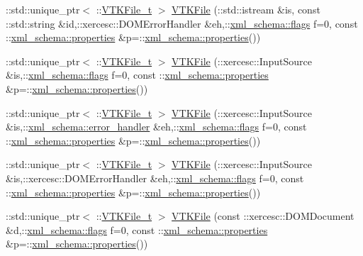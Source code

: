 \begin{DoxyCompactItemize}
\+::std\+::unique\+\_\+ptr$<$ \+::\hyperlink{classVTKFile__t}{V\+T\+K\+File\+\_\+t} $>$ \hyperlink{vtk-unstructured_8h_a05c0e5136170ae9d16a9c6422bab56b8}{V\+T\+K\+File} (\+::std\+::istream \&is, const \+::std\+::string \&id,\+::xercesc\+::\+D\+O\+M\+Error\+Handler \&eh,\+::\hyperlink{namespacexml__schema_a0612287d030cb2732d31a45b258fdc87}{xml\+\_\+schema\+::flags} f=0, const \+::\hyperlink{namespacexml__schema_a1a8ebac679580b41baebd62c7d641c1d}{xml\+\_\+schema\+::properties} \&p=\+::\hyperlink{namespacexml__schema_a1a8ebac679580b41baebd62c7d641c1d}{xml\+\_\+schema\+::properties}())
\item 
\+::std\+::unique\+\_\+ptr$<$ \+::\hyperlink{classVTKFile__t}{V\+T\+K\+File\+\_\+t} $>$ \hyperlink{vtk-unstructured_8h_aead3f615e5385068f5d1aac875400803}{V\+T\+K\+File} (\+::xercesc\+::\+Input\+Source \&is,\+::\hyperlink{namespacexml__schema_a0612287d030cb2732d31a45b258fdc87}{xml\+\_\+schema\+::flags} f=0, const \+::\hyperlink{namespacexml__schema_a1a8ebac679580b41baebd62c7d641c1d}{xml\+\_\+schema\+::properties} \&p=\+::\hyperlink{namespacexml__schema_a1a8ebac679580b41baebd62c7d641c1d}{xml\+\_\+schema\+::properties}())
\item 
\+::std\+::unique\+\_\+ptr$<$ \+::\hyperlink{classVTKFile__t}{V\+T\+K\+File\+\_\+t} $>$ \hyperlink{vtk-unstructured_8h_aa535bb5b5652e0ea5a64b840634d3590}{V\+T\+K\+File} (\+::xercesc\+::\+Input\+Source \&is,\+::\hyperlink{namespacexml__schema_a0a5d9528e9175cedf199984a8bb64d62}{xml\+\_\+schema\+::error\+\_\+handler} \&eh,\+::\hyperlink{namespacexml__schema_a0612287d030cb2732d31a45b258fdc87}{xml\+\_\+schema\+::flags} f=0, const \+::\hyperlink{namespacexml__schema_a1a8ebac679580b41baebd62c7d641c1d}{xml\+\_\+schema\+::properties} \&p=\+::\hyperlink{namespacexml__schema_a1a8ebac679580b41baebd62c7d641c1d}{xml\+\_\+schema\+::properties}())
\item 
\+::std\+::unique\+\_\+ptr$<$ \+::\hyperlink{classVTKFile__t}{V\+T\+K\+File\+\_\+t} $>$ \hyperlink{vtk-unstructured_8h_a49cc2ac4d05026d944c1a370658445f4}{V\+T\+K\+File} (\+::xercesc\+::\+Input\+Source \&is,\+::xercesc\+::\+D\+O\+M\+Error\+Handler \&eh,\+::\hyperlink{namespacexml__schema_a0612287d030cb2732d31a45b258fdc87}{xml\+\_\+schema\+::flags} f=0, const \+::\hyperlink{namespacexml__schema_a1a8ebac679580b41baebd62c7d641c1d}{xml\+\_\+schema\+::properties} \&p=\+::\hyperlink{namespacexml__schema_a1a8ebac679580b41baebd62c7d641c1d}{xml\+\_\+schema\+::properties}())
\item 
\+::std\+::unique\+\_\+ptr$<$ \+::\hyperlink{classVTKFile__t}{V\+T\+K\+File\+\_\+t} $>$ \hyperlink{vtk-unstructured_8h_abc5419b013f9118fbcf794d59bf761dd}{V\+T\+K\+File} (const \+::xercesc\+::\+D\+O\+M\+Document \&d,\+::\hyperlink{namespacexml__schema_a0612287d030cb2732d31a45b258fdc87}{xml\+\_\+schema\+::flags} f=0, const \+::\hyperlink{namespacexml__schema_a1a8ebac679580b41baebd62c7d641c1d}{xml\+\_\+schema\+::properties} \&p=\+::\hyperlink{namespacexml__schema_a1a8ebac679580b41baebd62c7d641c1d}{xml\+\_\+schema\+::properties}())

\end{DoxyCompactItemize}
